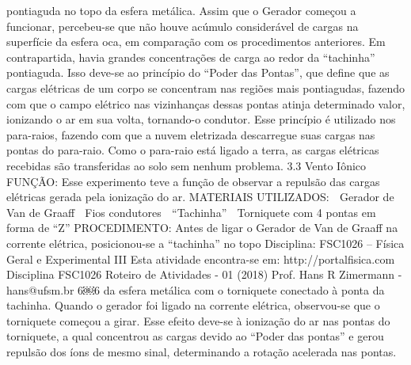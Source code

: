 pontiaguda no topo da esfera metálica.
Assim que o Gerador começou a funcionar, percebeu-se que não houve acúmulo considerável de 
cargas na superfície da esfera oca, em comparação com os procedimentos anteriores.
Em contrapartida, havia grandes concentrações de carga ao redor da “tachinha” pontiaguda. Isso 
deve-se ao princípio do “Poder das Pontas”, que define que as cargas elétricas de um corpo se
concentram nas regiões mais pontiagudas, fazendo com que o campo elétrico nas vizinhanças 
dessas pontas atinja determinado valor, ionizando o ar em sua volta, tornando-o condutor.
Esse princípio é utilizado nos para-raios, fazendo com que a nuvem eletrizada descarregue suas 
cargas nas pontas do para-raio. Como o para-raio está ligado a terra, as cargas elétricas recebidas 
são transferidas ao solo sem nenhum problema. 
3.3 Vento Iônico
FUNÇÃO:
Esse experimento teve a função de observar a repulsão das cargas elétricas gerada pela ionização 
do ar.
MATERIAIS UTILIZADOS: 
 Gerador de Van de Graaff
 Fios condutores
 “Tachinha”
 Torniquete com 4 pontas em forma de “Z”
PROCEDIMENTO: 
Antes de ligar o Gerador de Van de Graaff na corrente elétrica, posicionou-se a “tachinha” no topo 
Disciplina: FSC1026 – Física Geral e Experimental III
Esta atividade encontra-se em: http://portalfisica.com Disciplina FSC1026
Roteiro de Atividades - 01 (2018) 
Prof. Hans R Zimermann - hans@ufsm.br
6￼6
da esfera metálica com o torniquete conectado à ponta da tachinha. 
Quando o gerador foi ligado na corrente elétrica, observou-se que o torniquete começou a girar. 
Esse efeito deve-se à ionização do ar nas pontas do torniquete, a qual concentrou as cargas 
devido ao “Poder das pontas” e gerou repulsão dos íons de mesmo sinal, determinando a rotação 
acelerada nas pontas. 